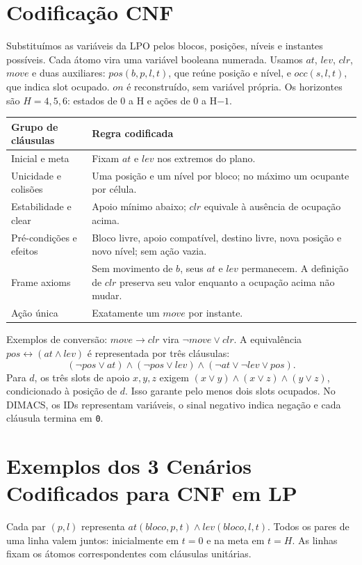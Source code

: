 \documentclass[11pt,a4paper]{article}
\newcommand{\code}[1]{\texttt{#1}}
\begin{document}
\section{Codificação CNF}
Substituímos as variáveis da LPO pelos blocos, posições, níveis e instantes possíveis. Cada átomo vira uma variável booleana numerada. Usamos $at$, $lev$, $clr$, $move$ e duas auxiliares: $pos(b,p,l,t)$, que reúne posição e nível, e $occ(s,l,t)$, que indica slot ocupado. $on$ é reconstruído, sem variável própria. Os horizontes são $H=4,5,6$: estados de 0 a H e ações de 0 a H$-1$.

\begin{tabularx}{\linewidth}{L{3.5cm}Y}
\toprule Grupo de cláusulas & Regra codificada \\ \midrule
Inicial e meta & Fixam $at$ e $lev$ nos extremos do plano.\\
Unicidade e colisões & Uma posição e um nível por bloco; no máximo um ocupante por célula.\\
Estabilidade e clear & Apoio mínimo abaixo; $clr$ equivale à ausência de ocupação acima.\\
Pré-condições e efeitos & Bloco livre, apoio compatível, destino livre, nova posição e novo nível; sem ação vazia.\\
Frame axioms & Sem movimento de $b$, seus $at$ e $lev$ permanecem. A definição de $clr$ preserva seu valor enquanto a ocupação acima não mudar.\\
Ação única & Exatamente um $move$ por instante.\\ \bottomrule
\end{tabularx}

Exemplos de conversão: $move\rightarrow clr$ vira $\neg move\lor clr$. A equivalência $pos\leftrightarrow(at\land lev)$ é representada por três cláusulas:
\[(\neg pos\lor at)\land(\neg pos\lor lev)\land(\neg at\lor\neg lev\lor pos).\]
Para $d$, os três slots de apoio $x,y,z$ exigem $(x\lor y)\land(x\lor z)\land(y\lor z)$, condicionado à posição de $d$. Isso garante pelo menos dois slots ocupados. No DIMACS, os IDs representam variáveis, o sinal negativo indica negação e cada cláusula termina em \code{0}.

\newpage
\section{Exemplos dos 3 Cenários Codificados para CNF em LP}
Cada par $(p,l)$ representa $at(bloco,p,t)\land lev(bloco,l,t)$. Todos os pares de uma linha valem juntos: inicialmente em $t=0$ e na meta em $t=H$. As linhas fixam os átomos correspondentes com cláusulas unitárias.
\end{document}

